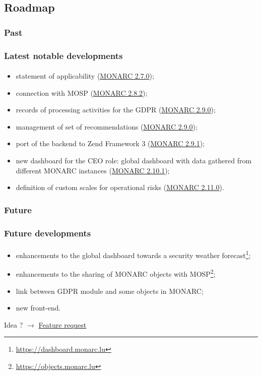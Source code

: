 \subsection{Roadmap}
\subsubsection{Past}
\begin{frame}
    \frametitle{Latest notable developments}
    \framesubtitle{}
    \begin{itemize}
      \item statement of applicability
        (\href{https://www.monarc.lu/news/2018/08/22/monarc-270-released/}{MONARC 2.7.0});
      \item connection with MOSP
        (\href{https://www.monarc.lu/news/2019/05/28/monarc-282-released/}{MONARC 2.8.2});
      \item records of processing activities for the GDPR
        (\href{https://www.monarc.lu/news/2019/08/23/monarc-290-released/}{MONARC 2.9.0});
      \item management of set of recommendations
        (\href{https://www.monarc.lu/news/2019/08/23/monarc-290-released/}{MONARC 2.9.0});
      \item port of the backend to Zend Framework 3
        (\href{https://www.monarc.lu/news/2019/11/25/monarc-291-released/}{MONARC 2.9.1});
      \item new dashboard for the CEO role: global dashboard with data gathered
        from different MONARC instances
        (\href{https://www.monarc.lu/news/2020/12/18/monarc-2101-released/}{MONARC 2.10.1});
      \item definition of custom scales for operational risks
        (\href{https://www.monarc.lu/news/2021/09/02/monarc-2110-released/}{MONARC 2.11.0}).
    \end{itemize}
\end{frame}

\subsubsection{Future}
\begin{frame}
    \frametitle{Future developments}
    \framesubtitle{}
    \begin{itemize}
        \item enhancements to the global dashboard towards a
            security weather forecast\footnote{\url{https://dashboard.monarc.lu}};
        \item enhancements to the sharing of MONARC objects with
            MOSP\footnote{\url{https://objects.monarc.lu}};
        \item link between GDPR module and some objects in MONARC;
        \item new front-end.
    \end{itemize}
    \bigskip
    Idea ?
    $\rightarrow$
    \href{https://github.com/monarc-project/MonarcAppFO/issues/new?labels=feature+request}{Feature request}
\end{frame}

